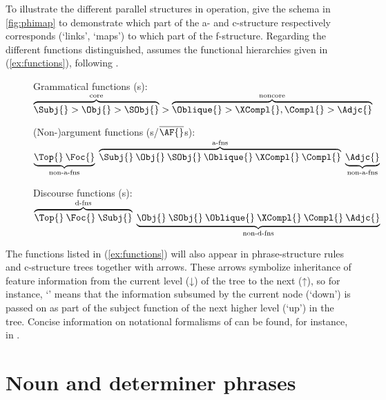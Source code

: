 To illustrate the different parallel structures in operation,
\citet[15]{bresnan2016} give the schema in \autoref{fig:phimap} to demonstrate
which part of the a- and c-structure respectively corresponds (`links', `maps')
to which part of the f-structure.
Regarding the different functions distinguished, \Lfg{} assumes the functional
hierarchies given in (\ref{ex:functions}), following \citet[97,
100]{bresnan2016}.

\begin{figure}[h]
\pex\label{ex:functions}
\a\label{ex:gfs} Grammatical functions (\GF{}s):\\
	$\overbrace{\Subj{} > \Obj{} > \SObj{}}^{\text{core}} > 
	\overbrace{\Oblique{} > \XCompl{}, \Compl{} > \Adjc{}}^{\text{noncore}}$

\a\label{ex:nonafs} (Non-)argument functions (\AF{}s/$\overline{\mbox{\AF{}}%
}$s):\\
	$\underbrace{\Top{}\: \Foc{}}_{\text{non-a-fns}}\; 
	\overbrace{\Subj{}\: \Obj{}\: \SObj{}\: \Oblique{}\: \XCompl{}\: 
		\Compl{}}^{\text{a-fns}}\; 
	\underbrace{\Adjc{}}_{\text{non-a-fns}}$

\a\label{ex:dfs} Discourse functions (\DF{}s):\\
	$\overbrace{\Top{}\: \Foc{}\: \Subj{}}^{\text{d-fns}}\;
	\underbrace{\Obj{}\: \SObj{}\: \Oblique{}\: \XCompl{}\: \Compl{}\: 
		\Adjc{}}_{\text{non-d-fns}}$
\xe
\end{figure}

The functions listed in (\ref{ex:functions}) will also appear in
phrase-structure rules and c-structure trees together with arrows. These arrows
symbolize inheritance of feature information from the current level (↓) of the
tree to the next (↑), so for instance, `\pass{\Subj}' means that the
information subsumed by the current node (`down') is passed on as part of the
subject function of the next higher level (`up') in the tree. Concise
information on notational formalisms of \Lfg{} can be found, for instance, in
\citet{buttking2015}.


\section{Noun and determiner phrases}
\label{sec:nps-dps}

